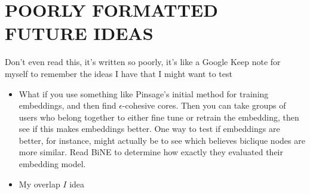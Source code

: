 \documentclass[conference]{IEEEtran}
\begin{document}
\section{POORLY FORMATTED FUTURE IDEAS}

Don't even read this, it's written so poorly, it's like a Google Keep note for myself to remember the ideas I have that I might want to test

\begin{itemize}
    \item What if you use something like Pinsage's initial method for training embeddings, and then find $\epsilon$-cohesive cores. Then you can take groups of users who belong together to either fine tune or retrain the embedding, then see if this makes embeddings better. One way to test if embeddings are better, for instance, might actually be to see which believes biclique nodes are more similar. Read BiNE to determine how exactly they evaluated their embedding model.
    \item My overlap $I$ idea
\end{itemize}




\appendix


\end{document}
